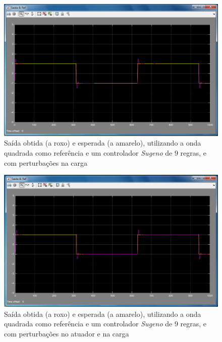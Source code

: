 \documentclass{article}
\begin{document}
\begin{figure}[h]
  \centering
      \includegraphics[scale=0.3]{Images/Sugeno_9_square_charge.png}
  \caption{Saída obtida (a roxo) e esperada (a amarelo), utilizando a onda quadrada como referência e um controlador \emph{Sugeno} de $9$ regras, e com perturbações na carga}
\end{figure}

\begin{figure}[h]
  \centering
      \includegraphics[scale=0.3]{Images/Sugeno_9_square_actuator_charge.png}
  \caption{Saída obtida (a roxo) e esperada (a amarelo), utilizando a onda quadrada como referência e um controlador \emph{Sugeno} de $9$ regras, e com perturbações no atuador e na carga}
\end{figure}

\clearpage

\end{document}
